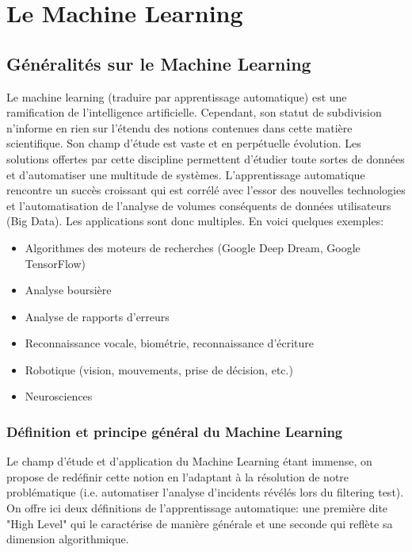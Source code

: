 \chapter{ Le  Machine Learning}
\label{Le Machine Learning}
\thispagestyle{fancy}

\section{Généralités sur le Machine Learning}
\label{Le Machine Learning: Généralités sur le Machine Learning}
Le machine learning (traduire par apprentissage automatique) est une ramification de l'intelligence artificielle. Cependant, son statut de subdivision n'informe en rien sur l'étendu des notions contenues dans cette matière scientifique. Son champ d'étude est vaste et en perpétuelle évolution. Les solutions offertes par cette discipline permettent d'étudier toute sortes de données et d'automatiser une multitude de systèmes. L'apprentissage automatique rencontre un succès croissant qui est corrélé avec l'essor des nouvelles technologies et l'automatisation de l'analyse de volumes conséquents de données utilisateurs (Big Data). Les applications sont donc multiples. En voici quelques exemples:  

\begin{itemize}
	\item Algorithmes des moteurs de recherches (Google Deep Dream, Google TensorFlow)
	\item Analyse boursière
	\item Analyse de rapports d'erreurs
	\item Reconnaissance vocale, biométrie, reconnaissance d'écriture
	\item Robotique (vision, mouvements, prise de décision, etc.)
	\item Neurosciences 
\end{itemize}

\subsection{Définition et principe général du Machine Learning}
\label{Le Machine Learning: Généralités sur le Machine Learning: Définition et principe général}
Le champ d'étude et d'application du Machine Learning étant immense, on propose de redéfinir cette notion en l'adaptant à la résolution de notre problématique (i.e. automatiser l'analyse d'incidents révélés lors du filtering test).
On offre ici deux définitions de l'apprentissage automatique: une première dite "High Level" qui le caractérise de manière générale et une seconde qui reflète sa dimension algorithmique. 

